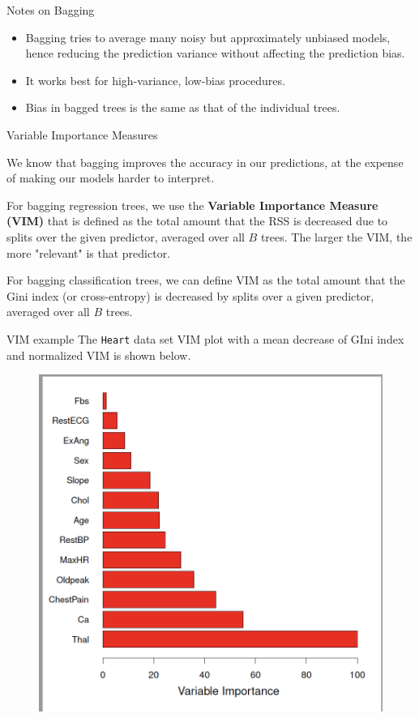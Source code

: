 \documentclass{beamer}
\begin{document}
\begin{frame}{Notes on Bagging}
	\begin{itemize}
		\item Bagging tries to average many noisy but approximately unbiased models, hence reducing the prediction variance without affecting the prediction bias. 
		\item It works best for high-variance, low-bias procedures.
		\item Bias in bagged trees is the same as that of the individual trees.
	\end{itemize}
\end{frame}

\begin{frame}{Variable Importance Measures}
	
	We know that bagging improves the accuracy in our predictions, at the expense of making our models harder to interpret. 
	
	For bagging regression trees, we use the {\bf Variable Importance Measure (VIM)} that is defined as the total amount that the RSS is decreased due to splits over the given predictor, averaged over all $B$ trees.  The larger the VIM, the more "relevant" is that predictor.
	
	For bagging classification trees, we can define VIM as the total amount that the Gini index (or cross-entropy) is decreased by splits over a given predictor, averaged over all $B$ trees. 
\end{frame}

\begin{frame}{VIM example}
	The {\tt Heart} data set VIM plot with a mean decrease of GIni index and normalized VIM is shown below.
	 \begin{figure}[h]
		\centering
		\includegraphics[scale=0.35]{../../Figures/fig_vim.png}
	\end{figure}
	
\end{frame}
\end{document}
